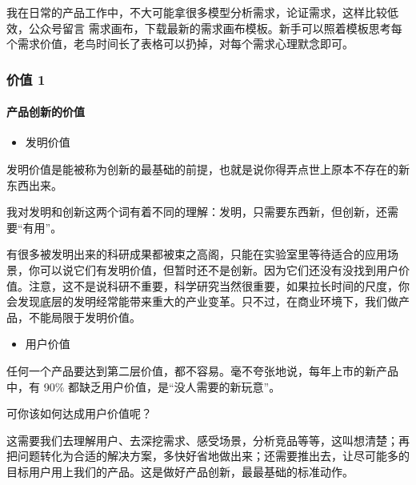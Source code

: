 \documentclass[letterpaper,11pt,english]{sphinxmanual}
\begin{document}
我在日常的产品工作中，不大可能拿很多模型分析需求，论证需求，这样比较低效，公众号留言
需求画布，下载最新的需求画布模板。新手可以照着模板思考每个需求价值，老鸟时间长了表格可以扔掉，对每个需求心理默念即可。


\subsubsection{价值 1\sphinxfootnotemark[748]}
\label{\detokenize{chapter_project/valuable:id1}}\label{\detokenize{chapter_project/valuable::doc}}%
\begin{footnotetext}[748]\sphinxAtStartFootnote
{}
%
\end{footnotetext}\ignorespaces 

\paragraph{产品创新的价值}
\label{\detokenize{chapter_project/valuable:id2}}\begin{itemize}
\item {} 
发明价值

\end{itemize}

发明价值是能被称为创新的最基础的前提，也就是说你得弄点世上原本不存在的新东西出来。

我对发明和创新这两个词有着不同的理解：发明，只需要东西新，但创新，还需要“有用”。

有很多被发明出来的科研成果都被束之高阁，只能在实验室里等待适合的应用场景，你可以说它们有发明价值，但暂时还不是创新。因为它们还没有没找到用户价值。注意，这不是说科研不重要，科学研究当然很重要，如果拉长时间的尺度，你会发现底层的发明经常能带来重大的产业变革。只不过，在商业环境下，我们做产品，不能局限于发明价值。
\begin{itemize}
\item {} 
用户价值

\end{itemize}

任何一个产品要达到第二层价值，都不容易。毫不夸张地说，每年上市的新产品中，有
90\% 都缺乏用户价值，是“没人需要的新玩意”。

可你该如何达成用户价值呢？

这需要我们去理解用户、去深挖需求、感受场景，分析竞品等等，这叫想清楚；再把问题转化为合适的解决方案，多快好省地做出来；还需要推出去，让尽可能多的目标用户用上我们的产品。这是做好产品创新，最最基础的标准动作。
\end{document}
